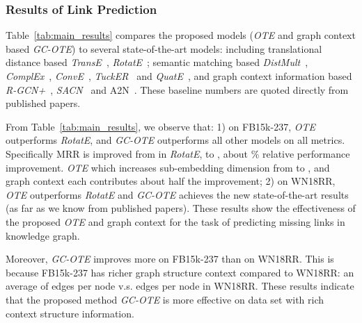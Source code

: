 \documentclass[11pt,a4paper]{article}
\begin{document}
\subsubsection{Results of Link Prediction}

Table~\ref{tab:main_results} compares the proposed models (\textit{OTE} and graph context based \textit{GC-OTE}) to several state-of-the-art models: including translational distance based {\textit{TransE}}~\cite{bordes2013translating}, {\textit{RotatE}}~\cite{Sun2019RotatEKG}; semantic matching based {\textit{DistMult}}~\cite{yang2014distmult}, {\textit{ComplEx}}~\cite{trouillon2016complex}, {\textit{ConvE}}~\cite{dettmers2017conve}, {\textit{TuckER}}~\cite{balazevic-etal-2019-tucker} and {\textit{QuatE}}~\cite{zhang2019quaternion}, and graph context information based {\textit{R-GCN+}}~\cite{Schlichtkrull2017ModelingRD}, {\textit{SACN}}~\cite{Shang2019EndtoEndSC} and {A2N}~\cite{Bansal2019A2NAT}. These baseline numbers are quoted directly from published papers.

From Table~\ref{tab:main_results}, we observe that: 1) on FB15k-237, {\it OTE} outperforms {\it RotatE}, and {\textit{GC-OTE}} outperforms all other models on all metrics.
Specifically MRR is improved from  in {\textit{RotatE}}, to , about \% relative performance improvement. {\it OTE} which increases sub-embedding dimension from  to , and graph context each contributes about half the improvement; 2) on WN18RR, {\it OTE} outperforms {\it RotatE} and {\textit{GC-OTE}} achieves the new state-of-the-art results (as far as we know from published papers). 
These results show the effectiveness of the proposed {\it OTE} and graph context for the task of predicting missing links in knowledge graph.

Moreover, {\textit{GC-OTE}} improves more on FB15k-237 than on WN18RR. This is because FB15k-237 has richer graph structure context compared to WN18RR: an average of  edges per node v.s.  edges per node in WN18RR. These results indicate that the proposed method {\it GC-OTE} is more effective on data set with rich context structure information. 
\end{document}
